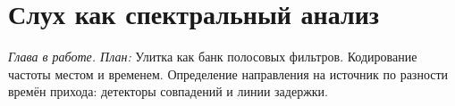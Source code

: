 \chapter{Слух как спектральный анализ}
\label{sec:hearing}

\emph{Глава в работе. План:} Улитка как банк полосовых фильтров. Кодирование частоты местом и временем. Определение направления на источник по разности времён прихода: детекторы совпадений и линии задержки.
